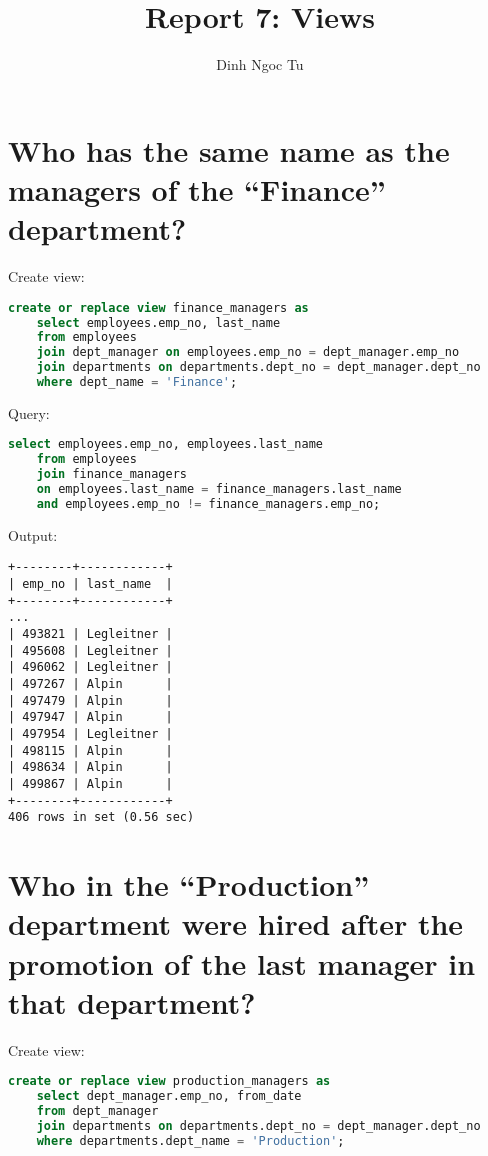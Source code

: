 \documentclass[12pt]{article}
\title{Report 7: Views}
\author{Dinh Ngoc Tu}
\begin{document}
\maketitle


\section{Who has the same name as the managers of the ``Finance'' department?}

Create view:
\begin{lstlisting}[language=SQL]
create or replace view finance_managers as
    select employees.emp_no, last_name
    from employees
    join dept_manager on employees.emp_no = dept_manager.emp_no
    join departments on departments.dept_no = dept_manager.dept_no
    where dept_name = 'Finance';
\end{lstlisting}

Query:

\begin{lstlisting}[language=SQL]
select employees.emp_no, employees.last_name
    from employees
    join finance_managers
    on employees.last_name = finance_managers.last_name
    and employees.emp_no != finance_managers.emp_no;
\end{lstlisting}

Output:

\begin{verbatim}
+--------+------------+
| emp_no | last_name  |
+--------+------------+
...
| 493821 | Legleitner |
| 495608 | Legleitner |
| 496062 | Legleitner |
| 497267 | Alpin      |
| 497479 | Alpin      |
| 497947 | Alpin      |
| 497954 | Legleitner |
| 498115 | Alpin      |
| 498634 | Alpin      |
| 499867 | Alpin      |
+--------+------------+
406 rows in set (0.56 sec)
\end{verbatim}


\section{Who in the ``Production'' department were hired after the promotion of the last manager in that department?}

Create view:
\begin{lstlisting}[language=SQL]
create or replace view production_managers as
    select dept_manager.emp_no, from_date
    from dept_manager
    join departments on departments.dept_no = dept_manager.dept_no
    where departments.dept_name = 'Production';
\end{lstlisting}
\end{document}
